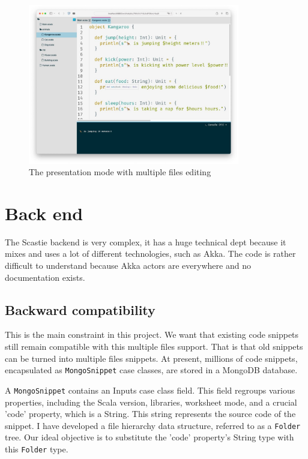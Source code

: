 \documentclass[a4paper,11pt,oneside]{report}
\begin{document}
\begin{figure}[h]
\centering
\includegraphics[height=7cm]{presentation.jpeg}
\caption{The presentation mode with multiple files editing}
\label{presentation}
\end{figure}

\newpage
\section{Back end}

The Scastie backend is very complex, it has a huge technical dept because it mixes and uses a lot of different technologies, such as Akka. The code is rather difficult to understand because Akka actors are everywhere and no documentation exists.

\subsection{Backward compatibility\label{backcomp}}
This is the main constraint in this project. We want that existing code snippets still remain compatible with this multiple files support. That is that old snippets can be turned into multiple files snippets. At present, millions of code snippets, encapsulated as \lstinline{MongoSnippet} case classes, are stored in a MongoDB database.

A \lstinline{MongoSnippet} contains an Inputs case class field. This field regroups various properties, including the Scala version, libraries, worksheet mode, and a crucial 'code' property, which is a String. This string represents the source code of the snippet. I have developed a file hierarchy data structure, referred to as a \lstinline{Folder} tree. Our ideal objective is to substitute the 'code' property's String type with this \lstinline{Folder} type.
\end{document}
